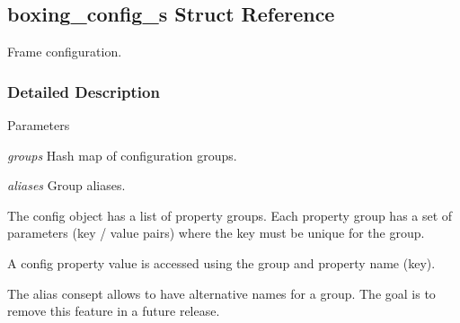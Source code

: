 \hypertarget{structboxing__config__s}{
\subsection{boxing\_\-config\_\-s Struct Reference}
\label{structboxing__config__s}
}


Frame configuration.  


\subsubsection{Detailed Description}

\begin{DoxyParams}{Parameters}
\item[{\em groups}]Hash map of configuration groups. \item[{\em aliases}]Group aliases.\end{DoxyParams}
The config object has a list of property groups. Each property group has a set of parameters (key / value pairs) where the key must be unique for the group.

A config property value is accessed using the group and property name (key).

The alias consept allows to have alternative names for a group. The goal is to remove this feature in a future release. 